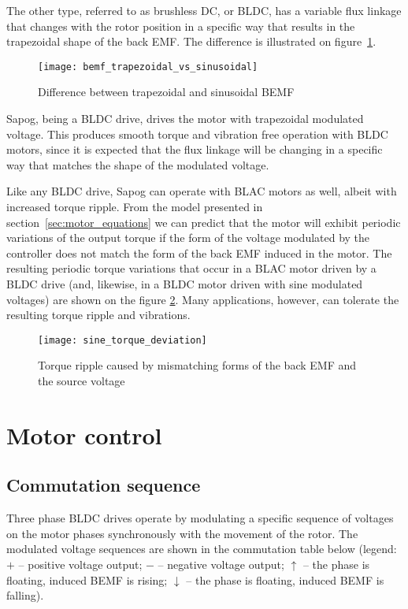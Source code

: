 \documentclass{zubaxdoc}
\begin{document}
The other type, referred to as brushless DC, or BLDC, has a variable flux linkage that changes with the
rotor position in a specific way that results in the trapezoidal shape of the back EMF.
The difference is illustrated on figure~\ref{bemf_trapezoidal_vs_sinusoidal}.

\begin{figure}[hbt]
	\centering
	\texttt{[image: bemf\_trapezoidal\_vs\_sinusoidal]}
	\caption{Difference between trapezoidal and sinusoidal BEMF
		\label{bemf_trapezoidal_vs_sinusoidal}}
\end{figure}

Sapog, being a BLDC drive, drives the motor with trapezoidal modulated voltage.
This produces smooth torque and vibration free operation with BLDC motors,
since it is expected that the flux linkage will be changing in a specific way
that matches the shape of the modulated voltage.

Like any BLDC drive, Sapog can operate with BLAC motors as well, albeit with increased torque ripple.
From the model presented in section~\ref{sec:motor_equations} we can predict that the motor
will exhibit periodic variations of the output torque if the form of the voltage modulated by the controller
does not match the form of the back EMF induced in the motor.
The resulting periodic torque variations that occur in a BLAC motor driven by a BLDC drive
(and, likewise, in a BLDC motor driven with sine modulated voltages) are shown on the figure
\ref{sine_torque_deviation}.
Many applications, however, can tolerate the resulting torque ripple and vibrations.

\begin{figure}[hbt]
	\centering
	\texttt{[image: sine\_torque\_deviation]}
	\caption{Torque ripple caused by mismatching forms of the back EMF and the source voltage
		\label{sine_torque_deviation}}
\end{figure}

\section{Motor control}

\subsection{Commutation sequence}

\newcommand{\BEMFH}{$\uparrow$}
\newcommand{\BEMFL}{$\downarrow$}

Three phase BLDC drives operate by modulating a specific sequence of voltages on the motor phases
synchronously with the movement of the rotor.
The modulated voltage sequences are shown in the commutation table below
(legend: $+$ -- positive voltage output; $-$ -- negative voltage output;
\BEMFH{} -- the phase is floating, induced BEMF is rising;
\BEMFL{} -- the phase is floating, induced BEMF is falling).
\end{document}
